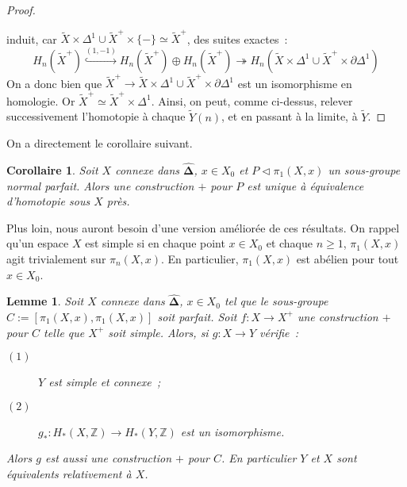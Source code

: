 \documentclass{amsart}
\theoremstyle{plain}
\newtheorem{coro}[theo]{Corollaire}
\newtheorem{lem}[theo]{Lemme}
\theoremstyle{definition}
\theoremstyle{remark}
\newcommand{\ensemblenombre }[1]{\mathbb{#1}}
\newcommand{\Z}{\ensemblenombre{Z}}
\newcommand{\DEns}{\widehat{\mathbf{\Delta}}}
\newcommand{\ra}{\rightarrow}
\begin{document}
\begin{proof}
\begin{center}
  \end{center}
  induit, car $\tilde{X}\times \Delta^1\cup\tilde{X}^+\times \{-\}\simeq \tilde{X}^+$, des suites exactes~:
  $$H_n(\tilde{X}^+)\overset{(1,-1)}{\hookrightarrow}H_n(\tilde{X}^+)\oplus H_n(\tilde{X}^+)\twoheadrightarrow%
    H_n(\tilde{X}\times\Delta^1\cup\tilde{X}^+\times\partial\Delta^1)$$
  On a donc bien que $\tilde{X}^+\ra \tilde{X}\times\Delta^1\cup\tilde{X}^+\times\partial\Delta^1$ est un isomorphisme en homologie.
  Or $\tilde{X}^+ \simeq \tilde{X}^+ \times \Delta^1$.
  Ainsi, on peut, comme ci-dessus, relever successivement l'homotopie à
  chaque $\tilde{Y}(n)$, et en passant à la limite, à $\tilde{Y}$.
\end{proof}

On a directement le corollaire suivant.

\begin{coro}\label{uniciteplustopologie}
  Soit $X$ connexe dans $\DEns$, $x\in X_0$ et $P\triangleleft \pi_1(X,x)$ un sous-groupe normal parfait.
  Alors une construction $+$ pour $P$ est unique à équivalence d'homotopie sous $X$ près.
\end{coro}

Plus loin, nous auront besoin d'une version améliorée de ces résultats. On rappel qu'un espace $X$ est simple si en chaque point $x\in X_0$ et chaque
$n\geq 1$, $\pi_1(X,x)$ agit trivialement sur $\pi_n(X,x)$. En particulier, $\pi_1(X,x)$ est abélien pour tout $x\in X_0$.

\begin{lem}
  Soit $X$ connexe dans $\DEns$, $x\in X_0$ tel que le sous-groupe $C:=[\pi_1(X,x),\pi_1(X,x)]$ soit parfait.
  Soit $f:X\ra X^+$ une construction $+$ pour $C$ telle que $X^+$ soit simple.
  Alors, si $g:X\ra Y$ vérifie~:
  \begin{description}
    \item[$(1)$] $Y$ est simple et connexe~;
    \item[$(2)$] $g_*:H_*(X,\Z)\ra H_*(Y,\Z)$ est un isomorphisme. 
  \end{description}
  Alors $g$ est aussi une construction $+$ pour $C$. En particulier $Y$ et $X$ sont équivalents relativement à $X$.
\end{lem}
\end{document}
